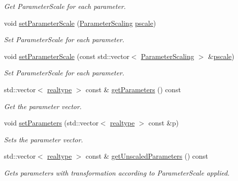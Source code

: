 \begin{DoxyCompactItemize}
\begin{DoxyCompactList}\small\item\em Get Parameter\+Scale for each parameter. \end{DoxyCompactList}\item 
void \mbox{\hyperlink{classamici_1_1_model_a7e25febbfd9db80f64a4f73a2718bda7}{set\+Parameter\+Scale}} (\mbox{\hyperlink{namespaceamici_a42f062082226e9284c201d9eab71a3a0}{Parameter\+Scaling}} \mbox{\hyperlink{classamici_1_1_model_a5d1c7237dc998202fe1b3393b50f77ce}{pscale}})
\begin{DoxyCompactList}\small\item\em Set Parameter\+Scale for each parameter. \end{DoxyCompactList}\item 
void \mbox{\hyperlink{classamici_1_1_model_a64aee7434ee9f99f004d8dc8eb776bc6}{set\+Parameter\+Scale}} (const std\+::vector$<$ \mbox{\hyperlink{namespaceamici_a42f062082226e9284c201d9eab71a3a0}{Parameter\+Scaling}} $>$ \&\mbox{\hyperlink{classamici_1_1_model_a5d1c7237dc998202fe1b3393b50f77ce}{pscale}})
\begin{DoxyCompactList}\small\item\em Set Parameter\+Scale for each parameter. \end{DoxyCompactList}\item 
std\+::vector$<$ \mbox{\hyperlink{namespaceamici_a1bdce28051d6a53868f7ccbf5f2c14a3}{realtype}} $>$ const  \& \mbox{\hyperlink{classamici_1_1_model_a1bb7ee08df1e2e42da7dceb2100b6131}{get\+Parameters}} () const
\begin{DoxyCompactList}\small\item\em Get the parameter vector. \end{DoxyCompactList}\item 
void \mbox{\hyperlink{classamici_1_1_model_af1e95f6479d442fcb4c63d16763d4acd}{set\+Parameters}} (std\+::vector$<$ \mbox{\hyperlink{namespaceamici_a1bdce28051d6a53868f7ccbf5f2c14a3}{realtype}} $>$ const \&p)
\begin{DoxyCompactList}\small\item\em Sets the parameter vector. \end{DoxyCompactList}\item 
std\+::vector$<$ \mbox{\hyperlink{namespaceamici_a1bdce28051d6a53868f7ccbf5f2c14a3}{realtype}} $>$ const  \& \mbox{\hyperlink{classamici_1_1_model_a76f62d983fb3842cb695681f7ed9a9f0}{get\+Unscaled\+Parameters}} () const
\begin{DoxyCompactList}\small\item\em Gets parameters with transformation according to Parameter\+Scale applied. \end{DoxyCompactList}\item 

\end{DoxyCompactItemize}
